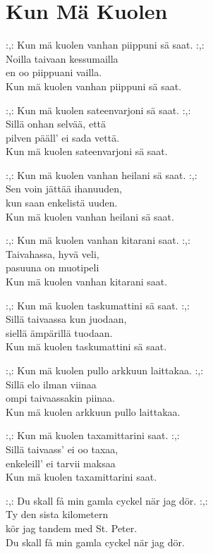 \section{Kun Mä Kuolen}
:,: Kun mä kuolen vanhan piippuni sä saat. :,:\\
Noilla taivaan kessumailla\\
en oo piippuani vailla.\\
Kun mä kuolen vanhan piippuni sä saat.

:,: Kun mä kuolen sateenvarjoni sä saat. :,:\\
Sillä onhan selvää, että\\
pilven pääll' ei sada vettä.\\
Kun mä kuolen sateenvarjoni sä saat.

:,: Kun mä kuolen vanhan heilani sä saat. :,:\\
Sen voin jättää ihanuuden,\\
kun saan enkelistä uuden.\\
Kun mä kuolen vanhan heilani sä saat.

:,: Kun mä kuolen vanhan kitarani saat. :,:\\
Taivahassa, hyvä veli,\\
pasuuna on muotipeli\\
Kun mä kuolen vanhan kitarani saat.

:,: Kun mä kuolen taskumattini sä saat. :,:\\
Sillä taivaassa kun juodaan,\\
siellä ämpärillä tuodaan.\\
Kun mä kuolen taskumattini sä saat.

:,: Kun mä kuolen pullo arkkuun laittakaa. :,:\\
Sillä elo ilman viinaa\\
ompi taivaassakin piinaa.\\
Kun mä kuolen arkkuun pullo laittakaa.

:,: Kun mä kuolen taxamittarini saat. :,:\\
Sillä taivaass’ ei oo taxaa,\\
enkeleill’ ei tarvii maksaa\\
Kun mä kuolen taxamittarini saat.

:,: Du skall få min gamla cyckel när jag dör. :,:\\
Ty den sista kilometern\\
kör jag tandem med St. Peter.\\
Du skall få min gamla cyckel när jag dör.

